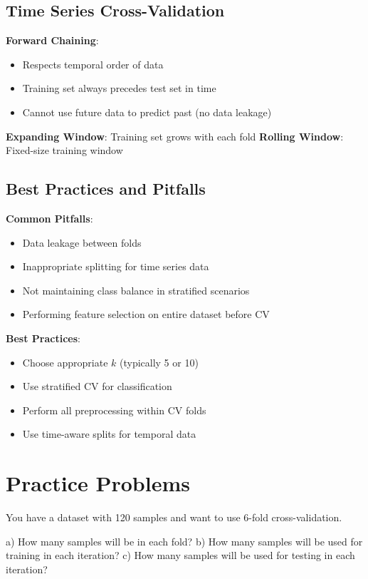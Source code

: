 \documentclass{article}
\newcounter{exercise}
\begin{document}
\subsection{Time Series Cross-Validation}

\textbf{Forward Chaining}: 
\begin{itemize}
    \item Respects temporal order of data
    \item Training set always precedes test set in time
    \item Cannot use future data to predict past (no data leakage)
\end{itemize}

\textbf{Expanding Window}: Training set grows with each fold
\textbf{Rolling Window}: Fixed-size training window

\subsection{Best Practices and Pitfalls}

\textbf{Common Pitfalls}:
\begin{itemize}
    \item Data leakage between folds
    \item Inappropriate splitting for time series data
    \item Not maintaining class balance in stratified scenarios
    \item Performing feature selection on entire dataset before CV
\end{itemize}

\textbf{Best Practices}:
\begin{itemize}
    \item Choose appropriate $k$ (typically 5 or 10)
    \item Use stratified CV for classification
    \item Perform all preprocessing within CV folds
    \item Use time-aware splits for temporal data
\end{itemize}

\section{Practice Problems}

\begin{tcolorbox}[colback=gray!5!white,colframe=gray!75!black,title=Problem \stepcounter{exercise}: Basic K-Fold Calculation]

You have a dataset with 120 samples and want to use 6-fold cross-validation.

a) How many samples will be in each fold?
b) How many samples will be used for training in each iteration?
c) How many samples will be used for testing in each iteration?
\end{tcolorbox}
\end{document}
